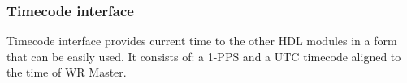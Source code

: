 \subsubsection{Timecode interface}
\label{sec:wrpc_timecode}

Timecode interface provides current time to the other HDL modules in a form that
can be easily used. It consists of: a 1-PPS and a UTC timecode
aligned to the time of WR Master.

